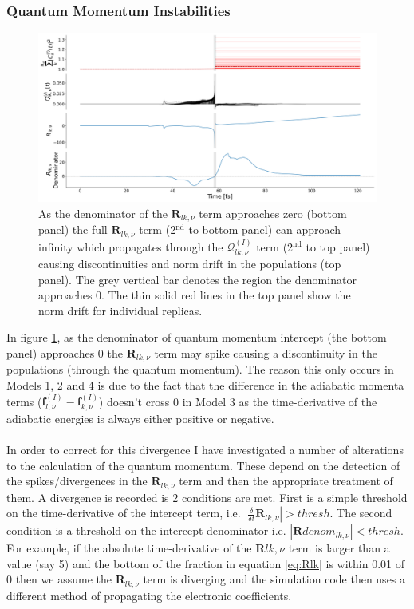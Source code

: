 \subsubsection{Quantum Momentum Instabilities}
\label{sect:QlkSpikes}
\begin{figure}[ht]
	\includegraphics[width=\textwidth]{./img/CTMQC/TullyModels/Spikes/RlkDenom_Rlk_Qlk_Norm.png}
	\caption{\label{fig:QlkSpike}As the denominator of the $\mathbf{R}_{lk,\nu}$ term approaches zero (bottom panel) the full $\mathbf{R}_{lk, \nu}$ term (2$^{\text{nd}}$ to bottom panel) can approach infinity which propagates through the $\mathcal{Q}_{lk, \nu}^{(I)}$ term (2$^{\text{nd}}$ to top panel) causing discontinuities and norm drift in the populations (top panel). The grey vertical bar denotes the region the denominator approaches 0. The thin solid red lines in the top panel show the norm drift for individual replicas.}
\end{figure}
\noindent In figure \ref{fig:QlkSpike}, as the denominator of quantum momentum intercept (the bottom panel) approaches 0 the $\mathbf{R}_{lk, \nu}$ term may spike causing a discontinuity in the populations (through the quantum momentum). The reason this only occurs in Models 1, 2 and 4 is due to the fact that the difference in the adiabatic momenta terms ($\mathbf{f}_{l, \nu}^{(I)} - \mathbf{f}_{k, \nu}^{(I)}$) doesn't cross 0 in Model 3 as the time-derivative of the adiabatic energies is always either positive or negative. 
\\\\
In order to correct for this divergence I have investigated a number of alterations to the calculation of the quantum momentum. These depend on the detection of the spikes/divergences in the $\mathbf{R}_{lk, \nu}$ term and then the appropriate treatment of them. A divergence is recorded is 2 conditions are met. First is a simple threshold on the time-derivative of the intercept term, i.e. $|\frac{\delta}{\delta t} \mathbf{R}_{lk, \nu}| > thresh$. The second condition is a threshold on the intercept denominator i.e. $|\mathbf{R}denom_{lk, \nu}| < thresh$. For example, if the absolute time-derivative of the $\mathbf{R}{lk, \nu}$ term is larger than a value (say 5) and the bottom of the fraction in equation \eqref{eq:Rlk} is within 0.01 of 0 then we assume the $\mathbf{R}_{lk, \nu}$ term is diverging and the simulation code then uses a different method of propagating the electronic coefficients.
